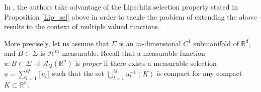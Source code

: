 \documentclass[a4paper,11pt,reqno]{amsart}
\theoremstyle{definition}
\newtheorem{definition}[theorem]{Definition}
\numberwithin{equation}{section}
\numberwithin{subsection}{section}
\newcommand{\R}{\mathbb{R}}
\newcommand{\A}{\mathcal{A}}
\newcommand{\Ha}{\mathcal{H}}
\begin{document}

\medskip

In \cite{DLS13a}, the authors take advantage of the Lipschitz selection property stated in Proposition \ref{Lip_sel} above in order to tackle the problem of extending the above results to the context of multiple valued functions.

More precisely, let us assume that $\Sigma$ is an $m$-dimensional $C^{1}$ submanifold of $\R^{d}$, and $B \subset \Sigma$ is $\Ha^{m}$-measurable. Recall that a measurable function $u \colon B \subset \Sigma \to \A_{Q}(\R^{n})$ is \emph{proper} if there exists a measurable selection $u = \sum_{l=1}^{Q} \llbracket u_{l} \rrbracket$ such that the set $\bigcup_{l=1}^{Q} \overline{u_{l}^{-1}(K)}$ is compact for any compact $K \subset \R^{n}$.

\end{document}

